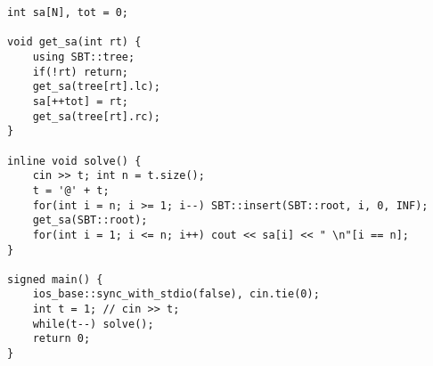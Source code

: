 \documentclass[]{article}
\begin{document}
\begin{verbatim}
int sa[N], tot = 0;

void get_sa(int rt) {
    using SBT::tree;
    if(!rt) return;
    get_sa(tree[rt].lc);
    sa[++tot] = rt;
    get_sa(tree[rt].rc);
}

inline void solve() {
    cin >> t; int n = t.size();
    t = '@' + t;
    for(int i = n; i >= 1; i--) SBT::insert(SBT::root, i, 0, INF); 
    get_sa(SBT::root);
    for(int i = 1; i <= n; i++) cout << sa[i] << " \n"[i == n];
}

signed main() {
    ios_base::sync_with_stdio(false), cin.tie(0);
    int t = 1; // cin >> t;
    while(t--) solve();
    return 0;
}
\end{verbatim}
\end{document}
